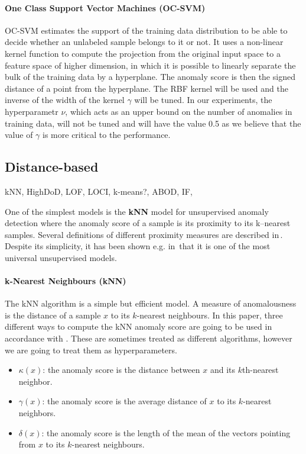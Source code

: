 \paragraph{One Class Support Vector Machines (OC-SVM)}
OC-SVM \cite{scholkopf2001estimating} estimates the support of the training data distribution to be able to decide whether an unlabeled sample belongs to it or not. It uses a non-linear kernel function to compute the projection from the original input space to a feature space of higher dimension, in which it is possible to linearly separate the bulk of the training data by a hyperplane. The anomaly score is then the signed distance of a point from the hyperplane.  The RBF kernel will be used and the inverse of the width of the kernel $\gamma$ will be tuned. In our experiments, the hyperparametr $\nu$, which acts as an upper bound on the number of anomalies in training data, will not be tuned and will have the value 0.5 as we believe that the value of $\gamma$ is more critical to the performance.


\subsection{Distance-based}

kNN, HighDoD, LOF, LOCI, k-means?, ABOD, IF, 

One of the simplest models is the \textbf{kNN} model for
unsupervised anomaly detection where the anomaly score of a sample
is its proximity to its k--nearest samples. Several definitions of
different proximity measures are described in\,\cite{harmeling2006outliers}.
Despite its simplicity, it has been shown e.g. in\,\cite{campos2016evaluation}
that it is one of the most universal unsupervised models.

\paragraph{k-Nearest Neighbours (kNN)}
The kNN algorithm \cite{ramaswamy2000efficient} is a simple but efficient model. A measure of anomalousness is the distance of a sample $x$ to its $k$-nearest neighbours. In this paper, three different ways to compute the kNN anomaly score are going to be used in accordance with \cite{harmeling2006outliers}. These are sometimes treated as different algorithms, however we are going to treat them as hyperparameters.
\begin{itemize}
  \item $\kappa(x)$: the anomaly score is the distance between $x$ and its $k$th-nearest neighbor.
  \item $\gamma(x)$: the anomaly score is the average distance of $x$ to its $k$-nearest neighbors. 
  \item $\delta(x)$: the anomaly score is the length of the mean of the vectors pointing from $x$ to its $k$-nearest neighbours.
\end{itemize}



